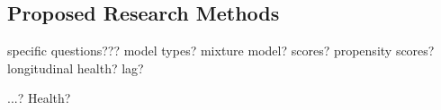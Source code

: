 
\subsection{Proposed Research Methods} \label{Health Methods}

specific questions???
model types?
mixture model?
scores? propensity scores?
longitudinal health?
lag?

...? Health?\\


